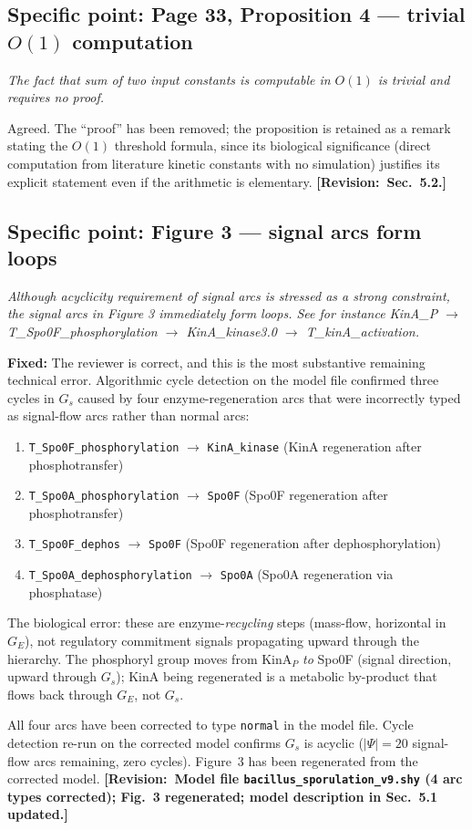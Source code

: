 \documentclass[11pt,letterpaper]{article}
\newcommand{\rquote}[1]{\begin{mdframed}[style=reviewquote]\textit{#1}\end{mdframed}}
\newcommand{\sref}[1]{\textbf{[Revision:~#1]}}
\newcommand{\fixed}[1]{\textcolor{blue!70!black}{\textbf{Fixed:} #1}}
\begin{document}
\subsection*{Specific point: Page 33, Proposition 4 --- trivial $O(1)$ computation}

\rquote{The fact that sum of two input constants is computable in $O(1)$ is
trivial and requires no proof.}

Agreed.
The ``proof'' has been removed; the proposition is retained as a remark
stating the $O(1)$ threshold formula, since its biological significance
(direct computation from literature kinetic constants with no simulation)
justifies its explicit statement even if the arithmetic is elementary.
\sref{Sec.~5.2.}

\subsection*{Specific point: Figure 3 --- signal arcs form loops}

\rquote{Although acyclicity requirement of signal arcs is stressed as a strong
constraint, the signal arcs in Figure 3 immediately form loops.
See for instance KinA\_P $\to$ T\_Spo0F\_phosphorylation $\to$ KinA\_kinase3.0
$\to$ T\_kinA\_activation.}

\fixed{The reviewer is correct, and this is the most substantive remaining
technical error.
Algorithmic cycle detection on the model file confirmed three cycles in $G_s$
caused by four enzyme-regeneration arcs that were incorrectly typed as
signal-flow arcs rather than normal arcs:
\begin{enumerate}
  \item \texttt{T\_Spo0F\_phosphorylation} $\to$ \texttt{KinA\_kinase}
    (KinA regeneration after phosphotransfer)
  \item \texttt{T\_Spo0A\_phosphorylation} $\to$ \texttt{Spo0F}
    (Spo0F regeneration after phosphotransfer)
  \item \texttt{T\_Spo0F\_dephos} $\to$ \texttt{Spo0F}
    (Spo0F regeneration after dephosphorylation)
  \item \texttt{T\_Spo0A\_dephosphorylation} $\to$ \texttt{Spo0A}
    (Spo0A regeneration via phosphatase)
\end{enumerate}
The biological error: these are enzyme-\emph{recycling} steps
(mass-flow, horizontal in $G_E$), not regulatory commitment signals
propagating upward through the hierarchy.
The phosphoryl group moves from KinA$_P$ \emph{to} Spo0F (signal direction,
upward through $G_s$); KinA being regenerated is a metabolic by-product
that flows back through $G_E$, not $G_s$.

All four arcs have been corrected to type \texttt{normal} in the model file.
Cycle detection re-run on the corrected model confirms $G_s$ is acyclic
($|\Psi| = 20$ signal-flow arcs remaining, zero cycles).
Figure~3 has been regenerated from the corrected model.
\sref{Model file \texttt{bacillus\_sporulation\_v9.shy} (4 arc types corrected);
Fig.~3 regenerated; model description in Sec.~5.1 updated.}}
\end{document}
